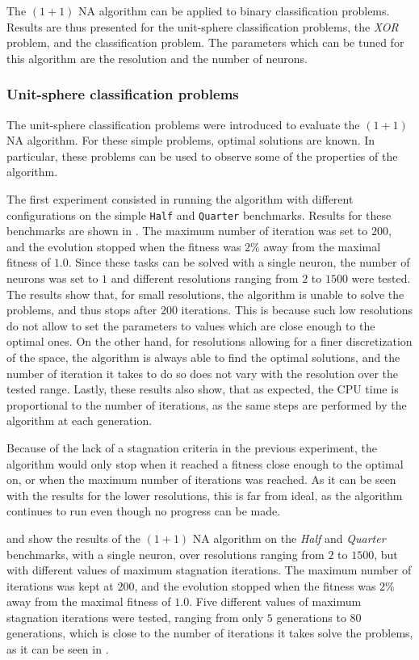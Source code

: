 The $(1 + 1)$ NA algorithm can be applied to binary classification problems. Results are thus presented for the unit-sphere classification problems, the \textit{XOR} problem, and
the  classification problem.
The parameters which can be tuned for this algorithm are the resolution and the number of neurons.

\subsubsection{Unit-sphere classification problems}

The unit-sphere classification problems \cite{na} were introduced to evaluate the $(1 + 1)$ NA algorithm. For these simple problems, optimal solutions are known. In particular, these
problems can be used to observe some of the properties of the algorithm.

The first experiment consisted in running the algorithm with different configurations on the simple \texttt{Half} and \texttt{Quarter} benchmarks.
Results for these benchmarks are shown in . The maximum number of iteration was set to $200$, and the evolution stopped when the fitness
was $2\%$ away from the maximal fitness of $1.0$. Since these tasks can be solved with a single neuron, the number of neurons was set to $1$ and different resolutions ranging
from $2$ to $1500$ were tested. The results show that, for small resolutions, the algorithm is unable to solve the problems, and thus stops after $200$ iterations. This is
because such low resolutions do not allow to set the parameters to values which are close enough to the optimal ones. On the other hand,
for resolutions allowing for a finer discretization of the space, the algorithm is always able to find the optimal solutions, and the number of iteration it takes to do so
does not vary with the resolution over the tested range. Lastly, these results also show, that as expected, the CPU time is proportional to the number of iterations,
as the same steps are performed by the algorithm at each generation.

Because of the lack of a stagnation criteria in the previous experiment, the algorithm would only stop when it reached a fitness close enough to the optimal on, or when
the maximum number of iterations was reached. As it can be seen with the results for the lower resolutions, this is far from ideal, as the algorithm continues to run even
though no progress can be made.

 and  show the results of the $(1 + 1)$ NA algorithm on the \textit{Half} and \textit{Quarter} benchmarks, with a single neuron, over
resolutions ranging from $2$ to $1500$, but with different values of maximum stagnation iterations. The maximum number of iterations was kept at $200$, and the evolution stopped when the fitness
was $2\%$ away from the maximal fitness of $1.0$. Five different values of maximum stagnation iterations were tested, ranging from only $5$ generations to $80$ generations, which is close to
the number of iterations it takes solve the problems, as it can be seen in .

